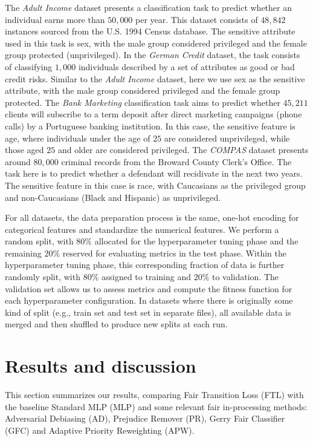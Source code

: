 The \textit{Adult Income} dataset presents a classification task to predict whether an individual earns more than $50,000$ per year. This dataset consists of $48,842$ instances sourced from the U.S. 1994 Census database. The sensitive attribute used in this task is sex, with the male group considered privileged and the female group protected (unprivileged). In the \textit{German Credit} dataset, the task consists of classifying $1,000$ individuals described by a set of attributes as good or bad credit risks. Similar to the \textit{Adult Income} dataset, here we use sex as the sensitive attribute, with the male group considered privileged and the female group protected. The \textit{Bank Marketing} classification task aims to predict whether $45,211$ clients will subscribe to a term deposit after direct marketing campaigns (phone calls) by a Portuguese banking institution. In this case, the sensitive feature is age, where individuals under the age of $25$ are considered unprivileged, while those aged $25$ and older are considered privileged. The \textit{COMPAS} dataset presents around $80,000$ criminal records from the Broward County Clerk’s Office. The task here is to predict whether a defendant will recidivate in the next two years. The sensitive feature in this case is race, with Caucasians as the privileged group and non-Caucasians (Black and Hispanic) as unprivileged.

For all datasets, the data preparation process is the same, one-hot encoding for categorical features and standardize the numerical features. We perform a random split, with $80\%$ allocated for the hyperparameter tuning phase and the remaining $20\%$ reserved for evaluating metrics in the test phase. Within the hyperparameter tuning phase, this corresponding fraction of data is further randomly split, with $80\%$ assigned to training and $20\%$ to validation. The validation set allows us to assess metrics and compute the fitness function for each hyperparameter configuration. In datasets where there is originally some kind of split (e.g., train set and test set in separate files), all available data is merged and then shuffled to produce new splits at each run.

\section{Results and discussion} \label{sec:ftl_results}

This section summarizes our results, comparing Fair Transition Loss (FTL) with the baseline Standard MLP (MLP) and some relevant fair in-processing methods: Adversarial Debiasing (AD), Prejudice Remover (PR), Gerry Fair Classifier (GFC) and Adaptive Priority Reweighting (APW).

